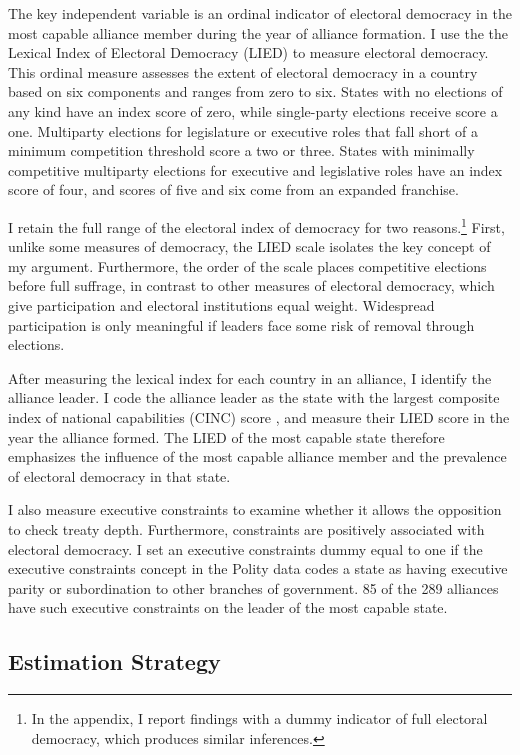 \documentclass[12pt]{article}
\begin{document}
The key independent variable is an ordinal indicator of electoral democracy in the most capable alliance member during the year of alliance formation. 
I use the the Lexical Index of Electoral Democracy (LIED) \citep{Skaaningetal2015} to measure electoral democracy.
This ordinal measure assesses the extent of electoral democracy in a country based on six components and ranges from zero to six.  
States with no elections of any kind have an index score of zero, while single-party elections receive score a one. 
Multiparty elections for legislature or executive roles that fall short of a minimum competition threshold score a two or three. 
States with minimally competitive multiparty elections for executive and legislative roles have an index score of four, and scores of five and six come from an expanded franchise.

I retain the full range of the electoral index of democracy for two reasons.\footnote{In the appendix, I report findings with a dummy indicator of full electoral democracy, which produces similar inferences.}
First, unlike some measures of democracy, the LIED scale isolates the key concept of my argument.
Furthermore, the order of the scale places competitive elections before full suffrage, in contrast to other measures of electoral democracy, which give participation and electoral institutions equal weight. 
Widespread participation is only meaningful if leaders face some risk of removal through elections.


After measuring the lexical index for each country in an alliance, I identify the alliance leader.   
I code the alliance leader as the state with the largest composite index of national capabilities (CINC) score \citep{SingerCINC1988}, and measure their LIED score in the year the alliance formed.
The LIED of the most capable state therefore emphasizes the influence of the most capable alliance member and the prevalence of electoral democracy in that state.


I also measure executive constraints to examine whether it allows the opposition to check treaty depth. 
Furthermore, constraints are positively associated with electoral democracy.
I set an executive constraints dummy equal to one if the executive constraints concept in the Polity data codes a state as having executive parity or subordination to other branches of government.
85 of the 289 alliances have such executive constraints on the leader of the most capable state.



\subsection{Estimation Strategy}
\end{document}

